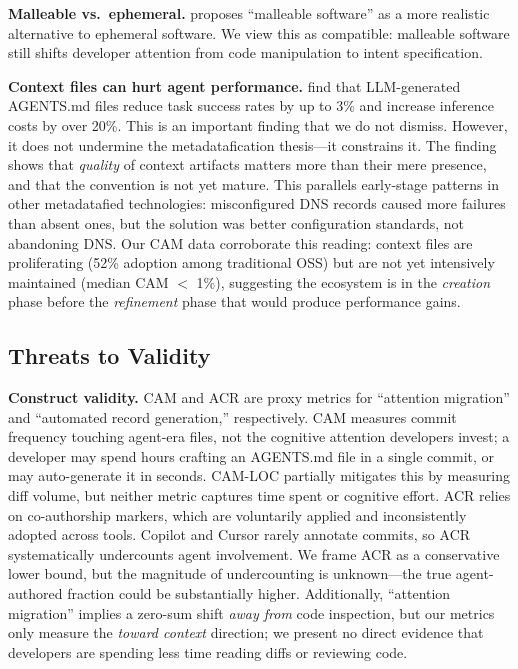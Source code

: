 \documentclass[sigconf, nonacm, anonymous=false]{acmart}
\begin{document}
\textbf{Malleable vs.\ ephemeral.} \citet{kirsch2026flawed} proposes ``malleable software'' as a more realistic alternative to ephemeral software. We view this as compatible: malleable software still shifts developer attention from code manipulation to intent specification.

\textbf{Context files can hurt agent performance.} \citet{gloaguen2026evaluatingagentsmd} find that LLM-generated AGENTS.md files reduce task success rates by up to 3\% and increase inference costs by over 20\%. This is an important finding that we do not dismiss. However, it does not undermine the metadatafication thesis---it constrains it. The finding shows that \textit{quality} of context artifacts matters more than their mere presence, and that the convention is not yet mature. This parallels early-stage patterns in other metadatafied technologies: misconfigured DNS records caused more failures than absent ones, but the solution was better configuration standards, not abandoning DNS. Our CAM data corroborate this reading: context files are proliferating (52\% adoption among traditional OSS) but are not yet intensively maintained (median CAM $<$ 1\%), suggesting the ecosystem is in the \textit{creation} phase before the \textit{refinement} phase that would produce performance gains.

\subsection{Threats to Validity}
\label{sec:tov}

\textbf{Construct validity.} CAM and ACR are proxy metrics for ``attention migration'' and ``automated record generation,'' respectively. CAM measures commit frequency touching agent-era files, not the cognitive attention developers invest; a developer may spend hours crafting an AGENTS.md file in a single commit, or may auto-generate it in seconds. CAM-LOC partially mitigates this by measuring diff volume, but neither metric captures time spent or cognitive effort. ACR relies on co-authorship markers, which are voluntarily applied and inconsistently adopted across tools. Copilot and Cursor rarely annotate commits, so ACR systematically undercounts agent involvement. We frame ACR as a conservative lower bound, but the magnitude of undercounting is unknown---the true agent-authored fraction could be substantially higher. Additionally, ``attention migration'' implies a zero-sum shift \textit{away from} code inspection, but our metrics only measure the \textit{toward context} direction; we present no direct evidence that developers are spending less time reading diffs or reviewing code.
\end{document}
